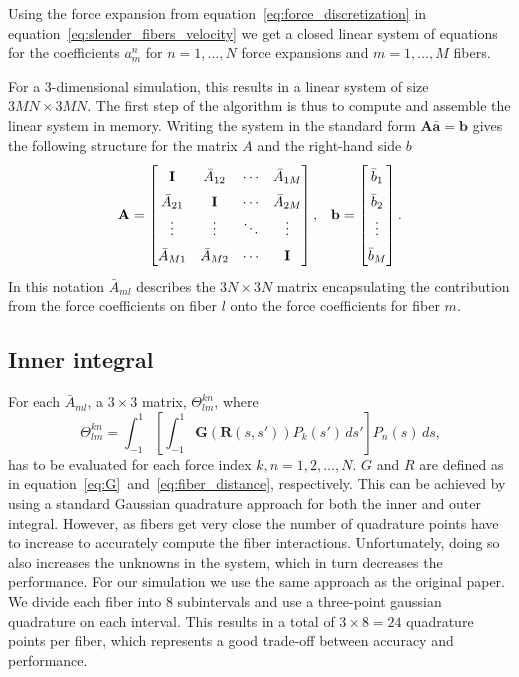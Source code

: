 Using the force expansion from equation~\ref{eq:force_discretization} in equation~\ref{eq:slender_fibers_velocity} we get a closed linear system of equations for the coefficients $a_{m}^{n}$ for $n=1,\dots,N$ force expansions and $m = 1,\dots,M$ fibers.

For a 3-dimensional simulation, this results in a linear system of size $3MN\times3MN$. The first step of the algorithm is thus to compute and assemble the linear system in memory. Writing the system in the standard form $\mathbf{A}\mathbf{\bar{a}}=\mathbf{b}$ gives the following structure for the matrix $A$ and the right-hand side $b$
\begin{equation}
  \label{eq:matrix_structure}
  \renewcommand\arraystretch{1.5}
  \mathbf{A} =
  \begin{bmatrix}
    \mathbf{I} & \bar{A}_{12} & \cdots & \bar{A}_{1M} \\
    \bar{A}_{21} & \mathbf{I} & \cdots & \bar{A}_{2M} \\
    \vdots & \vdots & \ddots & \vdots \\
    \bar{A}_{M1} & \bar{A}_{M2} & \cdots & \mathbf{I}
  \end{bmatrix} \text{,} \quad \mathbf{b} =
  \begin{bmatrix}
    \bar{b}_{1} \\
    \bar{b}_{2} \\
    \vdots \\
    \bar{b}_{M} \\
  \end{bmatrix} \text{.}
\end{equation}
In this notation $\bar{A}_{ml}$ describes the $3N\times3N$ matrix encapsulating the contribution from the force coefficients on fiber $l$ onto the force coefficients for fiber $m$.

\subsection{Inner integral}
\label{subsec:inner_integral}

For each $\bar{A}_{ml}$, a $3\times3$ matrix, $\Theta_{lm}^{kn}$, where
\begin{equation}
  \label{eq:inner_integral}
  \Theta_{lm}^{kn} = \int_{-1}^{1} \left[\int_{-1}^{1}\mathbf{G}(\mathbf{R}(s,s')) P_k(s') \, ds' \right]P_n(s) \, ds \text{,}
\end{equation}
has to be evaluated for each force index $k,n = 1,2,\dots,N$. $G$ and $R$ are defined as in equation~\eqref{eq:G}~and~\eqref{eq:fiber_distance}, respectively. This can be achieved by using a standard Gaussian quadrature approach for both the inner and outer integral. However, as fibers get very close the number of quadrature points have to increase to accurately compute the fiber interactions. Unfortunately, doing so also increases the unknowns in the system, which in turn decreases the performance. For our simulation we use the same approach as the original paper. We divide each fiber into 8 subintervals and use a three-point gaussian quadrature on each interval. This results in a total of $3 \times 8 = 24$ quadrature points per fiber, which represents a good trade-off between accuracy and performance.

